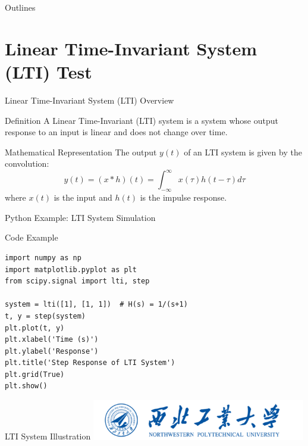 \documentclass[10pt]{beamer}
\begin{document}
\begin{frame}[plain]
  \titlepage
\end{frame}

\begin{frame}[plain]{Outlines}
  \tableofcontents
\end{frame}

\section{Linear Time-Invariant System (LTI) Test}
\begin{frame}{Linear Time-Invariant System (LTI) Overview}
  \begin{block}{Definition}
    A Linear Time-Invariant (LTI) system is a system whose output response to an input is linear and does not change over time.
  \end{block}
  \begin{block}{Mathematical Representation}
    The output $y(t)$ of an LTI system is given by the convolution:
    \[
      y(t) = (x * h)(t) = \int_{-\infty}^{\infty} x(\tau) h(t-\tau) d\tau
    \]
    where $x(t)$ is the input and $h(t)$ is the impulse response.
  \end{block}
\end{frame}

\begin{frame}[fragile]{Python Example: LTI System Simulation}
  \begin{block}{Code Example}
    \lstset{
      language=Python,
    }
    \begin{lstlisting}
import numpy as np
import matplotlib.pyplot as plt
from scipy.signal import lti, step

system = lti([1], [1, 1])  # H(s) = 1/(s+1)
t, y = step(system)
plt.plot(t, y)
plt.xlabel('Time (s)')
plt.ylabel('Response')
plt.title('Step Response of LTI System')
plt.grid(True)
plt.show()
    \end{lstlisting}
  \end{block}
\end{frame}

\begin{frame}{LTI System Illustration}
  \centering
  \includegraphics[width=0.7\textwidth]{logo/logo.png}
\end{frame}
\end{document}
